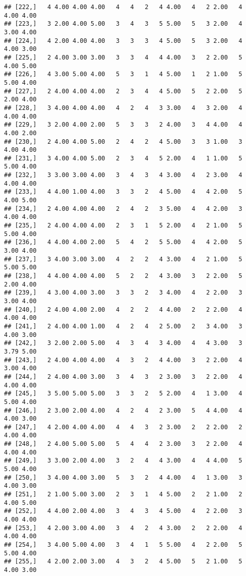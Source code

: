 \documentclass[]{article}
\begin{document}
\begin{verbatim}
## [222,]   4 4.00 4.00 4.00   4   4   2   4 4.00   4   2 2.00   4 4.00 4.00
## [223,]   3 2.00 4.00 5.00   3   4   3   5 5.00   5   3 2.00   4 3.00 4.00
## [224,]   4 2.00 4.00 4.00   3   3   3   4 5.00   5   3 2.00   4 4.00 3.00
## [225,]   2 4.00 3.00 3.00   3   3   4   4 4.00   3   2 2.00   5 4.00 5.00
## [226,]   4 3.00 5.00 4.00   5   3   1   4 5.00   1   2 1.00   5 5.00 4.00
## [227,]   2 4.00 4.00 4.00   2   3   4   4 5.00   5   2 2.00   5 2.00 4.00
## [228,]   3 4.00 4.00 4.00   4   2   4   3 3.00   4   3 2.00   4 4.00 4.00
## [229,]   3 2.00 4.00 2.00   5   3   3   2 4.00   3   4 4.00   4 4.00 2.00
## [230,]   2 4.00 4.00 5.00   2   4   2   4 5.00   3   3 1.00   3 4.00 4.00
## [231,]   3 4.00 4.00 5.00   2   3   4   5 2.00   4   1 1.00   5 5.00 4.00
## [232,]   3 3.00 3.00 4.00   3   4   3   4 3.00   4   2 3.00   4 4.00 4.00
## [233,]   4 4.00 1.00 4.00   3   3   2   4 5.00   4   4 2.00   5 4.00 5.00
## [234,]   2 4.00 4.00 4.00   2   4   2   3 5.00   4   4 2.00   3 4.00 4.00
## [235,]   2 4.00 4.00 4.00   2   3   1   5 2.00   4   2 1.00   5 5.00 4.00
## [236,]   4 4.00 4.00 2.00   5   4   2   5 5.00   4   4 2.00   5 3.00 4.00
## [237,]   3 4.00 3.00 3.00   4   2   2   4 3.00   4   2 1.00   5 5.00 5.00
## [238,]   4 4.00 4.00 4.00   5   2   2   4 3.00   3   2 2.00   5 2.00 4.00
## [239,]   4 3.00 4.00 3.00   3   3   2   3 4.00   4   2 2.00   3 3.00 4.00
## [240,]   2 4.00 4.00 2.00   4   2   2   4 4.00   2   2 2.00   4 4.00 4.00
## [241,]   2 4.00 4.00 1.00   4   2   4   2 5.00   2   3 4.00   3 4.00 3.00
## [242,]   3 2.00 2.00 5.00   4   3   4   3 4.00   4   4 3.00   3 3.79 5.00
## [243,]   2 4.00 4.00 4.00   4   3   2   4 4.00   3   2 2.00   4 3.00 4.00
## [244,]   2 4.00 4.00 3.00   3   4   3   2 3.00   3   2 2.00   4 4.00 4.00
## [245,]   3 5.00 5.00 5.00   3   3   2   5 2.00   4   1 3.00   4 5.00 4.00
## [246,]   2 3.00 2.00 4.00   4   2   4   2 3.00   5   4 4.00   4 4.00 3.00
## [247,]   4 2.00 4.00 4.00   4   4   3   2 3.00   2   2 2.00   2 4.00 4.00
## [248,]   2 4.00 5.00 5.00   5   4   4   2 3.00   3   2 2.00   4 4.00 4.00
## [249,]   3 3.00 2.00 4.00   3   2   4   4 3.00   4   4 4.00   5 5.00 4.00
## [250,]   3 4.00 4.00 3.00   5   3   2   4 4.00   4   1 3.00   3 4.00 3.00
## [251,]   2 1.00 5.00 3.00   2   3   1   4 5.00   2   2 1.00   2 4.00 5.00
## [252,]   4 4.00 2.00 4.00   3   4   3   4 5.00   4   2 2.00   3 4.00 4.00
## [253,]   4 2.00 3.00 4.00   3   4   2   4 3.00   2   2 2.00   4 4.00 4.00
## [254,]   3 4.00 5.00 4.00   3   4   1   5 5.00   4   2 2.00   5 5.00 4.00
## [255,]   4 2.00 2.00 3.00   4   3   2   4 5.00   5   2 1.00   5 4.00 3.00

\end{verbatim}
\end{document}
